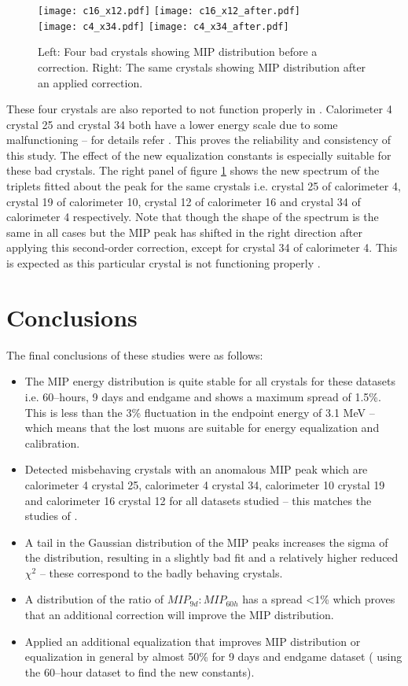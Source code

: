 \documentclass[article,accept,moreauthors,pdftex,10pt,a4paper]{../MDPI_template/Definitions/mdpi}
\begin{document}
\begin{figure}[H]
\texttt{[image: c16\_x12.pdf]}%
\texttt{[image: c16\_x12\_after.pdf]}\\%
\texttt{[image: c4\_x34.pdf]}%
\texttt{[image: c4\_x34\_after.pdf]}%
\caption{\label{fig6}Left: Four bad crystals showing MIP distribution before a correction. 
Right: The same crystals showing MIP distribution after an applied correction.}
\end{figure} 
\noindent These four crystals are also reported to not function properly in \cite{docdb16874}. 
Calorimeter 4 crystal 25 and crystal 34 both have a lower energy scale due to some malfunctioning -- 
for details refer \cite{docdb16874}. This proves the reliability and consistency of this study. 
The effect of the new equalization constants is especially suitable for these bad crystals. 
The right panel of figure \ref{fig6} shows the new spectrum of the triplets fitted about the peak for 
the same crystals i.e. crystal 25 of calorimeter 4, crystal 19 of calorimeter 10, crystal 12 of calorimeter 16 
and crystal 34 of calorimeter 4 respectively. Note that though the shape of the 
spectrum is the same in all cases but the MIP peak has shifted in the right direction after applying this 
second-order correction, except for crystal 34 of calorimeter 4. This is expected as this particular crystal 
is not functioning properly \cite{docdb16874}.%
\section{Conclusions}
\noindent The final conclusions of these studies were as follows:
\begin{itemize}
\item The MIP energy distribution is quite stable for all crystals for these datasets i.e. 60--hours, 9 days and endgame and shows 
a maximum spread of 1.5\%. This is less than the 3\% fluctuation in the endpoint energy of 3.1 MeV – which
 means that the lost muons are suitable for energy equalization and calibration\cite{c2}. 
\item Detected misbehaving crystals with an anomalous MIP peak which are calorimeter 4 crystal 25, calorimeter 4 crystal 34, 
calorimeter 10 crystal 19 and calorimeter 16 crystal 12 for all 
datasets studied – this matches the studies of \cite{docdb16874}. 
\item A tail in the Gaussian distribution of the MIP peaks increases the sigma of the distribution, resulting in a slightly bad fit 
and a relatively higher reduced $\chi^2$ -- these correspond to the badly behaving crystals. 
\item A distribution of the ratio of $MIP_{9d}:MIP_{60h}$ has a spread <1\% which proves that an additional correction will 
improve the MIP distribution. 
\item Applied an additional equalization that improves MIP distribution or equalization 
in general by almost 50\% for 9 days and endgame dataset ( using  the 60--hour dataset to find the new constants).
\end{itemize} 
\end{document}
